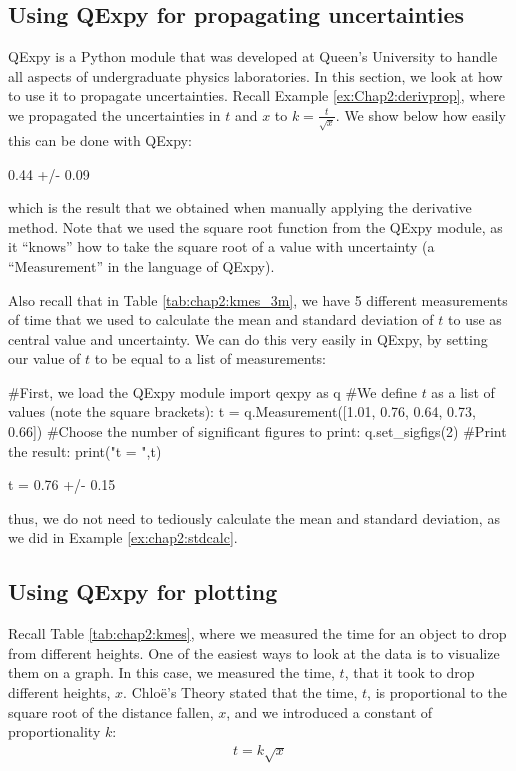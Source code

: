\subsection{Using QExpy for propagating uncertainties}
QExpy is a Python module that was developed at Queen's University to handle all aspects of undergraduate physics laboratories. In this section, we look at how to use it to propagate uncertainties. Recall Example \ref{ex:Chap2:derivprop}, where we propagated the uncertainties in $t$ and $x$ to $k=\frac{t}{\sqrt x}$. We show below how easily this can be done with QExpy:

\begin{poutput}
0.44 +/- 0.09
\end{poutput}
which is the result that we obtained when manually applying the derivative method. Note that we used the square root function from the QExpy module, as it ``knows'' how to take the square root of a value with uncertainty (a ``Measurement'' in the language of QExpy). 

Also recall that in Table \ref{tab:chap2:kmes_3m}, we have 5 different measurements of time that we used to calculate the mean and standard deviation of $t$ to use as central value and uncertainty. We can do this very easily in QExpy, by setting our value of $t$ to be equal to a list of measurements:
\begin{python}[caption=QExpy to calculate mean and standard deviation] 
#First, we load the QExpy module
import qexpy as q
#We define $t$ as a list of values (note the square brackets):
t = q.Measurement([1.01,  0.76,  0.64,  0.73,  0.66])
#Choose the number of significant figures to print:
q.set_sigfigs(2)
#Print the result:
print("t = ",t)
\end{python}
\begin{poutput}
t = 0.76 +/- 0.15
\end{poutput}
thus, we do not need to tediously calculate the mean and standard deviation, as we did in Example \ref{ex:chap2:stdcalc}.
\subsection{Using QExpy for plotting}
Recall Table \ref{tab:chap2:kmes}, where we measured the time for an object to drop from different heights. One of the easiest ways to look at the data is to visualize them on a graph. In this case, we measured the time, $t$, that it took to drop different heights, $x$. Chlo\"e's Theory stated that the time, $t$, is proportional to the square root of the distance fallen, $x$, and we introduced a constant of proportionality $k$:
\begin{align*}
t = k \sqrt{x}
\end{align*}

